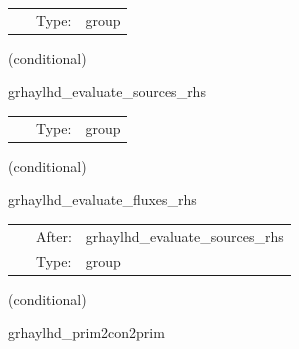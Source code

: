 \documentclass{article}
\begin{document}
\hspace{5mm}{\it evaluate rhss grhd equations } 


\hspace{5mm}

 \begin{tabular*}{160mm}{cll} 
~ & Type:  & group \\ 
\end{tabular*} 


\vspace{5mm}

   (conditional) 

\hspace{5mm} grhaylhd\_evaluate\_sources\_rhs 

\hspace{5mm}{\it evaluate source terms in grhd rhss } 


\hspace{5mm}

 \begin{tabular*}{160mm}{cll} 
~ & Type:  & group \\ 
\end{tabular*} 


\vspace{5mm}

   (conditional) 

\hspace{5mm} grhaylhd\_evaluate\_fluxes\_rhs 

\hspace{5mm}{\it evaluate flux terms in grhd rhss } 


\hspace{5mm}

 \begin{tabular*}{160mm}{cll} 
~ & After:  & grhaylhd\_evaluate\_sources\_rhs \\ 
~ & Type:  & group \\ 
\end{tabular*} 


\vspace{5mm}

   (conditional) 

\hspace{5mm} grhaylhd\_prim2con2prim 

\hspace{5mm}{\it convert hydrobase initial data to grhaylhd variables } 


\hspace{5mm}
\end{document}
